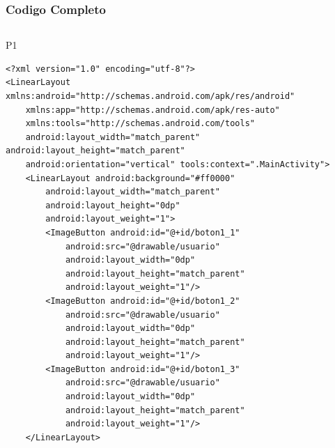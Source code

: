 \begin{frame}[fragile]
\frametitle{Codigo Completo} 
\begin{columns}
\begin{block}{P1}
\begin{verbatim}
<?xml version="1.0" encoding="utf-8"?>
<LinearLayout xmlns:android="http://schemas.android.com/apk/res/android"
    xmlns:app="http://schemas.android.com/apk/res-auto"
    xmlns:tools="http://schemas.android.com/tools"
    android:layout_width="match_parent" android:layout_height="match_parent"
    android:orientation="vertical" tools:context=".MainActivity">
    <LinearLayout android:background="#ff0000"
        android:layout_width="match_parent"
        android:layout_height="0dp"
        android:layout_weight="1">
        <ImageButton android:id="@+id/boton1_1"
            android:src="@drawable/usuario"
            android:layout_width="0dp"
            android:layout_height="match_parent"
            android:layout_weight="1"/>
        <ImageButton android:id="@+id/boton1_2"
            android:src="@drawable/usuario"
            android:layout_width="0dp"
            android:layout_height="match_parent"
            android:layout_weight="1"/>
        <ImageButton android:id="@+id/boton1_3"
            android:src="@drawable/usuario"
            android:layout_width="0dp"
            android:layout_height="match_parent"
            android:layout_weight="1"/>
    </LinearLayout>
\end{verbatim}
\end{block}
\end{columns}
\end{frame}

